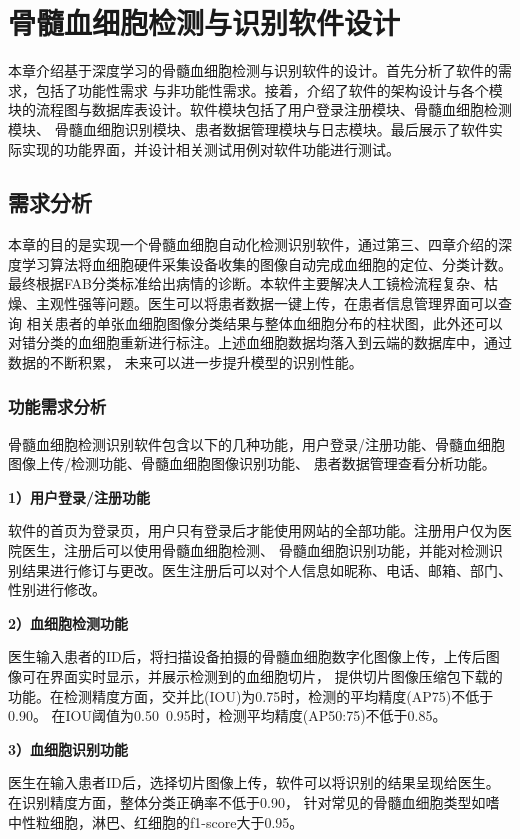 \chapter{骨髓血细胞检测与识别软件设计}
本章介绍基于深度学习的骨髓血细胞检测与识别软件的设计。首先分析了软件的需求，包括了功能性需求
与非功能性需求。接着，介绍了软件的架构设计与各个模块的流程图与数据库表设计。软件模块包括了用户登录注册模块、骨髓血细胞检测模块、
骨髓血细胞识别模块、患者数据管理模块与日志模块。最后展示了软件实际实现的功能界面，并设计相关测试用例对软件功能进行测试。


\section{需求分析}
本章的目的是实现一个骨髓血细胞自动化检测识别软件，通过第三、四章介绍的深度学习算法将血细胞硬件采集设备收集的图像自动完成血细胞的定位、分类计数。
最终根据FAB分类标准给出病情的诊断。本软件主要解决人工镜检流程复杂、枯燥、主观性强等问题。医生可以将患者数据一键上传，在患者信息管理界面可以查询
相关患者的单张血细胞图像分类结果与整体血细胞分布的柱状图，此外还可以对错分类的血细胞重新进行标注。上述血细胞数据均落入到云端的数据库中，通过数据的不断积累，
未来可以进一步提升模型的识别性能。

\subsection{功能需求分析}
骨髓血细胞检测识别软件包含以下的几种功能，用户登录/注册功能、骨髓血细胞图像上传/检测功能、骨髓血细胞图像识别功能、
患者数据管理查看分析功能。

\textbf{1）用户登录/注册功能}

软件的首页为登录页，用户只有登录后才能使用网站的全部功能。注册用户仅为医院医生，注册后可以使用骨髓血细胞检测、
骨髓血细胞识别功能，并能对检测识别结果进行修订与更改。医生注册后可以对个人信息如昵称、电话、邮箱、部门、性别进行修改。

\textbf{2）血细胞检测功能}

医生输入患者的ID后，将扫描设备拍摄的骨髓血细胞数字化图像上传，上传后图像可在界面实时显示，并展示检测到的血细胞切片，
提供切片图像压缩包下载的功能。在检测精度方面，交并比(IOU)为0.75时，检测的平均精度(AP75)不低于0.90。
在IOU阈值为0.50~0.95时，检测平均精度(AP50:75)不低于0.85。


\textbf{3）血细胞识别功能}

医生在输入患者ID后，选择切片图像上传，软件可以将识别的结果呈现给医生。在识别精度方面，整体分类正确率不低于0.90，
针对常见的骨髓血细胞类型如嗜中性粒细胞，淋巴、红细胞的f1-score大于0.95。

